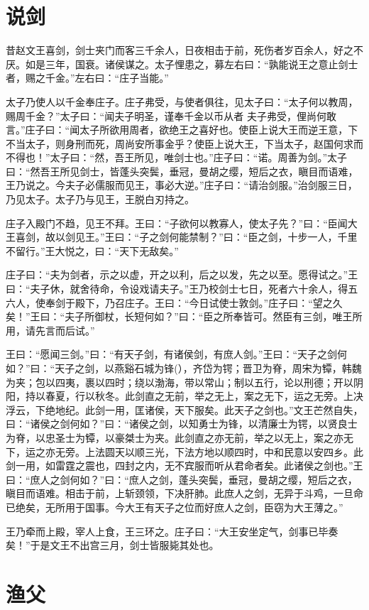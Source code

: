 \documentclass[12pt,UTF8]{ctexbook}
\begin{document}
\section{说剑}

昔赵文王喜剑，剑士夹门而客三千余人，日夜相击于前，死伤者岁百余人，好之不厌。如是三年，国衰。诸侯谋之。太子悝患之，募左右曰：“孰能说王之意止剑士者，赐之千金。”左右曰：“庄子当能。”

太子乃使人以千金奉庄子。庄子弗受，与使者俱往，见太子曰：“太子何以教周，赐周千金？”太子曰：“闻夫子明圣，谨奉千金以币从者 夫子弗受，俚尚何敢言。”庄子曰：“闻太子所欲用周者，欲绝王之喜好也。使臣上说大王而逆王意，下不当太子，则身刑而死，周尚安所事金乎？使臣上说大王，下当太子，赵国何求而不得也！”太子曰：“然，吾王所见，唯剑士也。”庄子曰：“诺。周善为剑。”太子曰：“然吾王所见剑士，皆蓬头突鬓，垂冠，曼胡之缨，短后之衣，瞋目而语难， 王乃说之。今夫子必儒服而见王，事必大逆。”庄子曰：“请治剑服。”治剑服三日，乃见太子。太子乃与见王，王脱白刃持之。

庄子入殿门不趋，见王不拜。王曰：“子欲何以教寡人，使太子先？”曰：“臣闻大王喜剑，故以剑见王。”王曰：“子之剑何能禁制？”曰：“臣之剑，十步一人，千里不留行。”王大悦之，曰：“天下无敌矣。”

庄子曰：“夫为剑者，示之以虚，开之以利，后之以发，先之以至。愿得试之。”王曰：“夫子休，就舍待命，令设戏请夫子。”王乃校剑士七日，死者六十余人，得五六人，使奉剑于殿下，乃召庄子。王曰：“今日试使士敦剑。”庄子曰：“望之久矣！”王曰：“夫子所御杖，长短何如？”曰：“臣之所奉皆可。然臣有三剑，唯王所用，请先言而后试。”

王曰：“愿闻三剑。”曰：“有天子剑，有诸侯剑，有庶人剑。”王曰：“天子之剑何如？”曰：“天子之剑，以燕谿石城为锋(），齐岱为锷；晋卫为脊，周宋为镡，韩魏为夹；包以四夷，裹以四时；绕以渤海，带以常山；制以五行，论以刑德；开以阴阳，持以春夏，行以秋冬。此剑直之无前，举之无上，案之无下，运之无旁。上决浮云，下绝地纪。此剑一用，匡诸侯，天下服矣。此天子之剑也。”文王芒然自失，曰：“诸侯之剑何如？”曰：“诸侯之剑，以知勇士为锋，以清廉士为锷，以贤良士为脊，以忠圣士为镡，以豪桀士为夹。此剑直之亦无前，举之以无上，案之亦无下，运之亦无旁。上法圆天以顺三光，下法方地以顺四时，中和民意以安四乡。此剑一用，如雷霆之震也，四封之内，无不宾服而听从君命者矣。此诸侯之剑也。”王曰：“庶人之剑何如？”曰：“庶人之剑，蓬头突鬓，垂冠，曼胡之缨，短后之衣，瞋目而语难。相击于前，上斩颈领，下决肝肺。此庶人之剑，无异于斗鸡，一旦命已绝矣，无所用于国事。今大王有天子之位而好庶人之剑，臣窃为大王薄之。”

王乃牵而上殿，宰人上食，王三环之。庄子曰：“大王安坐定气，剑事已毕奏矣！”于是文王不出宫三月，剑士皆服毙其处也。
\section{渔父}
\end{document}
